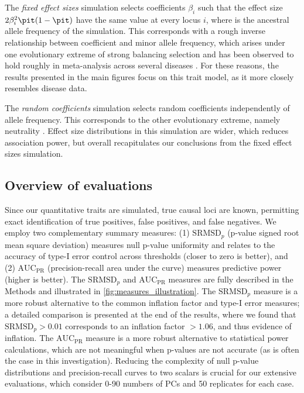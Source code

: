 \documentclass[11pt]{article}
\newcommand{\rmsd}{\text{SRMSD}_p}
\newcommand{\auc}{\text{AUC}_\text{PR}}
\begin{document}
The \textit{fixed effect sizes} simulation selects coefficients $\beta_i$ such that the effect size $2 \beta_i^2 \pit ( 1 - \pit )$ have the same value at every locus $i$, where \pit is the ancestral allele frequency of the simulation.
This corresponds with a rough inverse relationship between coefficient and minor allele frequency, which arises under one evolutionary extreme of strong balancing selection \citep{simons_population_2018} and has been observed to hold roughly in meta-analysis across several diseases \citep{park_distribution_2011}.
For these reasons, the results presented in the main figures focus on this trait model, as it more closely resembles disease data.

The \textit{random coefficients} simulation selects random coefficients independently of allele frequency.
This corresponds to the other evolutionary extreme, namely neutrality \citep{simons_population_2018}.
Effect size distributions in this simulation are wider, which reduces association power, but overall recapitulates our conclusions from the fixed effect sizes simulation.

\subsection{Overview of evaluations}

Since our quantitative traits are simulated, true causal loci are known, permitting exact identification of true positives, false positives, and false negatives.
We employ two complementary summary measures:
(1) $\rmsd$ (p-value signed root mean square deviation) measures null p-value uniformity and relates to the accuracy of type-I error control across thresholds (closer to zero is better), and
(2) $\auc$ (precision-recall area under the curve) measures predictive power (higher is better).
The $\rmsd$ and $\auc$ measures are fully described in the Methods and illustrated in \cref{fig:measures_illustration}.
The $\rmsd$ measure is a more robust alternative to the common inflation factor and type-I error measures; a detailed comparison is presented at the end of the results, where we found that $\rmsd > 0.01$ corresponds to an inflation factor $> 1.06$, and thus evidence of inflation.
The $\auc$ measure is a more robust alternative to statistical power calculations, which are not meaningful when p-values are not accurate (as is often the case in this investigation).
Reducing the complexity of null p-value distributions and precision-recall curves to two scalars is crucial for our extensive evaluations, which consider 0-90 numbers of PCs and 50 replicates for each case.
\end{document}
